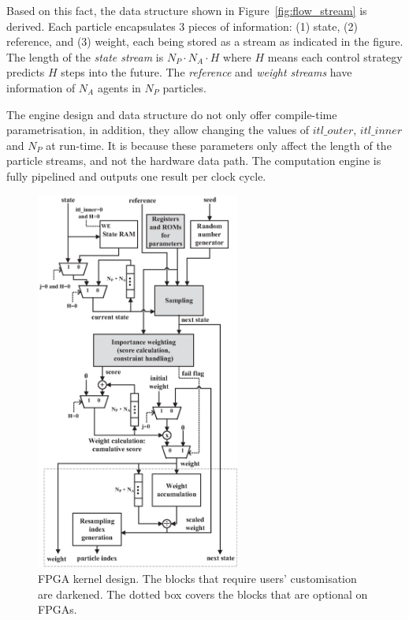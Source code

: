 Based on this fact, the data structure shown in Figure~\ref{fig:flow_stream} is derived.
Each particle encapsulates 3 pieces of information: (1) state, (2) reference, and (3) weight, each being stored as a stream as indicated in the figure.
The length of the \textit{state stream} is $N_P \cdot N_A \cdot H$ where $H$ means each control strategy predicts $H$ steps into the future.
The \textit{reference} and \textit{weight streams} have information of $N_A$ agents in $N_P$ particles.

The engine design and data structure do not only offer compile-time parametrisation, in addition, they allow changing the values of $itl\_outer$, $itl\_inner$ and $N_P$ at run-time.
It is because these parameters only affect the length of the particle streams, and not the hardware data path.
The computation engine is fully pipelined and outputs one result per clock cycle.

\begin{figure}[t!]
\begin{center}
\includegraphics[width=0.6\textwidth]{5_tool/figures/kernel}
\end{center}
\caption{FPGA kernel design. The blocks that require users' customisation are darkened. The dotted box covers the blocks that are optional on FPGAs.}
\label{fig:flow_kernel}
\end{figure}

